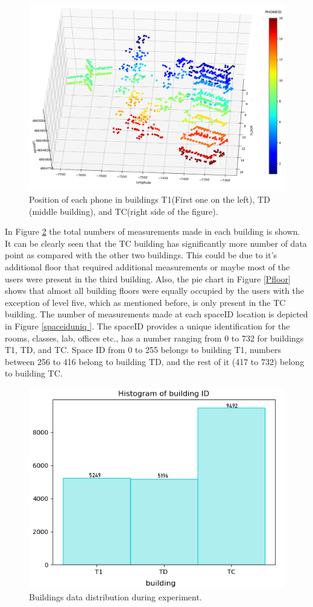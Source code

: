 \begin{figure}
    \centering
    \includegraphics[width = 10 cm]{image/Chapters/Chapter6/LatLongUser.png}
    \caption{Position of each phone in buildings T1(First one on the left), TD (middle building), and TC(right side of the figure).}
    \label{phoneall}
\end{figure}


In Figure \ref{bdd} the total numbers of measurements made in each building is shown. It can be clearly seen that the TC building has significantly more number of data point as compared with the other two buildings. This could be due to it's additional floor that required additional measurements or maybe most of the users were present in the third building. Also, the pie chart in Figure \ref{Pfloor} shows that almost all building floors were equally occupied by the users with the exception of level five, which as mentioned before, is only present in the TC building. The number of measurements made at each spaceID location is depicted in Figure \ref{spaceiduniq }. The spaceID provides a unique identification for the rooms, classes, lab, offices etc., has a number ranging from 0 to 732 for  buildings T1, TD, and TC. Space ID from 0 to 255 belongs to building T1, numbers between 256 to 416 belong to building TD, and the rest of it (417 to 732) belong to building TC.



\begin{figure}
    \centering
    \includegraphics[width = 12 cm]{image/Chapters/Chapter6/buidlingID.png}
    \caption{Buildings data distribution during experiment. }
    \label{bdd}
\end{figure}





